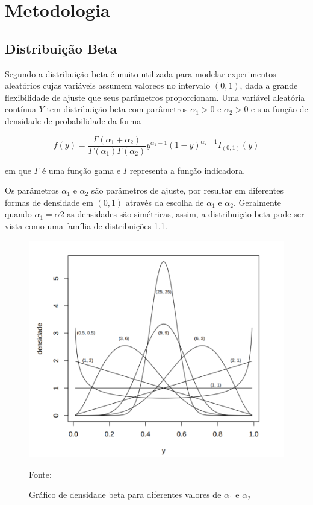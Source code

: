 \chapter{Metodologia}


\section{Distribuição Beta}

Segundo \cite{gomes2005} a distribuição beta é muito utilizada para modelar experimentos aleatórios cujas variáveis assumem valoreos no intervalo $(0,1)$, dada a grande flexibilidade de ajuste que seus parâmetros proporcionam. Uma variável aleatória contínua $Y$ tem distribuição beta com parâmetros $\alpha_1 > 0$ e $\alpha_2 > 0$ e sua função de densidade de probabilidade da forma

\begin{equation}
f(y)=\frac {\Gamma(\alpha_1+\alpha_2)}{\Gamma(\alpha_1)\Gamma(\alpha_2)} y^{\alpha_1-1}(1-y)^{\alpha_2-1}I_{(0,1)}(y)
\end{equation}

em que $\Gamma$ é uma função gama e $I$ representa a função indicadora.

Os parâmetros $\alpha_1$ e $\alpha_2$ são parâmetros de ajuste, por resultar em diferentes formas de densidade em $(0,1)$ através da escolha de $\alpha_1$ e $\alpha_2$. Geralmente quando $\alpha_1 = \alpha2$ as densidades são simétricas, assim, a distribuição beta pode ser vista como uma família de distribuições  \ref{fig06}.


\begin{figure}[!h]
	\centering
	\includegraphics[keepaspectratio=true,scale=0.3]{figuras/dist-beta1.png}
	\caption{Gráfico de densidade beta para diferentes valores de $\alpha_1$ e $\alpha_2$}
	Fonte: \cite{gomes2005}
	\label{fig06}
\end{figure}


